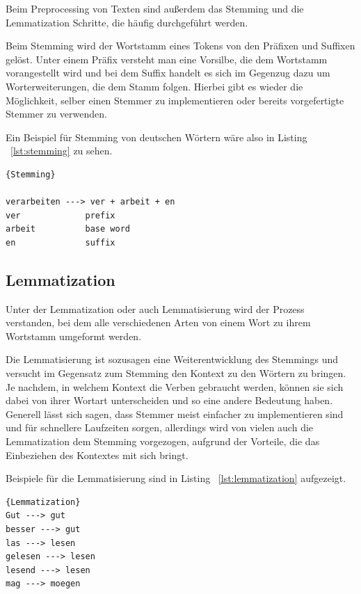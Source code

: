 Beim Preprocessing von Texten sind außerdem das Stemming und die Lemmatization Schritte, die häufig durchgeführt werden.

Beim Stemming wird der Wortstamm eines Tokens von den Präfixen und Suffixen gelöst.
Unter einem Präfix versteht man eine Vorsilbe, die dem Wortstamm vorangestellt wird und bei dem Suffix handelt es sich im Gegenzug dazu um Worterweiterungen, die dem Stamm folgen.
Hierbei gibt es wieder die Möglichkeit, selber einen Stemmer zu implementieren oder bereits vorgefertigte Stemmer zu verwenden.\cite{textAnalysisMonkeylearn, machineLearningTextAnalysis}

Ein Beispiel für Stemming von deutschen Wörtern wäre also in Listing ~\ref{lst:stemming} zu sehen.

\begin{lstlisting}[label={lst:stemming},caption={Stemming von deutschen Wörtern}]{Stemming}

verarbeiten ---> ver + arbeit + en
ver             prefix
arbeit          base word
en              suffix
\end{lstlisting}

\subsection{Lemmatization}\label{subsec:lemmatization}

Unter der Lemmatization oder auch Lemmatisierung wird der Prozess verstanden, bei dem alle verschiedenen Arten von einem Wort zu ihrem Wortstamm umgeformt werden.

Die Lemmatisierung ist sozusagen eine Weiterentwicklung des Stemmings und versucht im Gegensatz zum Stemming den Kontext zu den Wörtern zu bringen.
Je nachdem, in welchem Kontext die Verben gebraucht werden, können sie sich dabei von ihrer Wortart unterscheiden und so eine andere Bedeutung haben.
Generell lässt sich sagen, dass Stemmer meist einfacher zu implementieren sind und für schnellere Laufzeiten sorgen, allerdings wird von vielen auch die Lemmatization dem Stemming vorgezogen, aufgrund der Vorteile, die das Einbeziehen des Kontextes mit sich bringt.\cite{machineLearningTextAnalysis, textAnalysisMonkeylearn, stemmingLemmatization}


Beispiele für die Lemmatisierung sind in Listing ~\ref{lst:lemmatization} aufgezeigt.

\begin{lstlisting}[label={lst:lemmatization},caption={Lemmatisierung von deutschen Wörtern}]{Lemmatization}
Gut ---> gut
besser ---> gut
las ---> lesen
gelesen ---> lesen
lesend ---> lesen
mag ---> moegen

\end{lstlisting}

